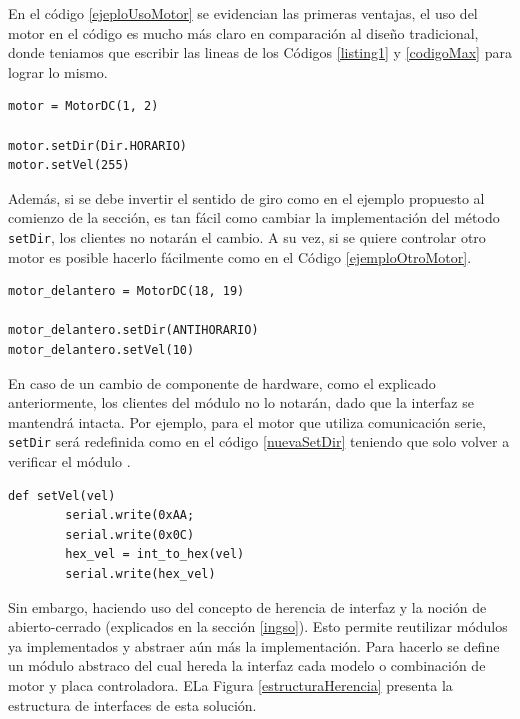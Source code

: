 En el código \ref{ejeploUsoMotor} se evidencian las primeras ventajas, el uso del motor en el código es mucho más claro en comparación al diseño tradicional, donde teniamos que escribir las lineas de los Códigos \ref{listing1} y \ref{codigoMax} para lograr lo mismo.

\begin{lstlisting}[caption=Ejemplo de uso de la interfaz del módulo MotorDC, label={ejeploUsoMotor}]
motor = MotorDC(1, 2)

motor.setDir(Dir.HORARIO)
motor.setVel(255)
\end{lstlisting}

Además, si se debe invertir el sentido de giro como en el ejemplo propuesto al comienzo de la sección, es tan fácil como cambiar la implementación del método \verb|setDir|, los clientes no notarán el cambio. A su vez, si se quiere controlar otro motor es posible hacerlo fácilmente como en el Código \ref{ejemploOtroMotor}. 

\begin{lstlisting}[caption=Ejemplo control nuevo motor DC.,label={ejemploOtroMotor}]
motor_delantero = MotorDC(18, 19)

motor_delantero.setDir(ANTIHORARIO)
motor_delantero.setVel(10)
\end{lstlisting}


En caso de un cambio de componente de hardware, como el explicado anteriormente, los clientes del módulo no lo notarán, dado que la interfaz se mantendrá intacta. Por ejemplo, para el motor que utiliza comunicación serie, \verb|setDir| será redefinida como en el código \ref{nuevaSetDir} teniendo que solo volver a verificar el módulo \MotorDC.

\begin{lstlisting}[caption=Implementación método setVel para el motor que utiliza comunicación serie.,label={nuevaSetDir}]
def setVel(vel)
        serial.write(0xAA;
        serial.write(0x0C)
        hex_vel = int_to_hex(vel)
        serial.write(hex_vel)
\end{lstlisting}

Sin embargo, haciendo uso del concepto de herencia de interfaz y la noción de abierto-cerrado (explicados en la sección \ref{ingso}). Esto permite reutilizar módulos ya implementados y abstraer aún más la implementación. Para hacerlo se define un módulo abstraco \textit{\MotorDC} del cual hereda la interfaz cada modelo o combinación de motor y placa controladora. ELa Figura \ref{estructuraHerencia} presenta la estructura de interfaces de esta solución.

